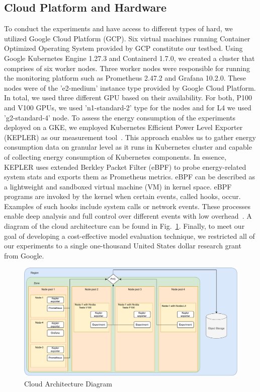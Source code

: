 \documentclass[conference]{IEEEtran}
\begin{document}
\subsection{Cloud Platform and Hardware}
To conduct the experiments and have access to different types of hard, we utilized Google Cloud Platform (GCP). Six virtual machines running Container Optimized Operating System provided by GCP constitute our testbed. Using Google Kubernetes Engine 1.27.3 and Containerd 1.7.0,  we created a cluster that comprises of six worker nodes. Three worker nodes were responsible for running the monitoring platform such as Prometheus 2.47.2 and Grafana 10.2.0. These nodes were of the 'e2-medium' instance type provided by Google Cloud Platform. In total, we used three different GPU based on their availability. For both, P100 and V100 GPUs, we used 'n1-standard-2' type for the nodes and for L4  we used 'g2-standard-4' node.
To assess the energy consumption of the experiments deployed on a GKE, we employed Kubernetes Efficient Power Level Exporter (KEPLER) as our measurement tool~\cite{amaral2023kepler}. This approach enables us to gather energy consumption data on granular level as it runs in Kubernetes cluster and capable of collecting energy consumption of Kubernetes components. In essence, KEPLER uses extended Berkley Packet Filter (eBPF) to probe energy-related system stats and exports them as Prometheus metrics. eBPF can be described as a lightweight and sandboxed virtual machine (VM) in kernel space. eBPF programs are invoked by the kernel when certain events, called hooks, occur. Examples of such hooks include system calls or network events. These processes enable deep analysis and full control over different events with low overhead~\cite{sedghpour@ebpf}. A diagram of the cloud architecture can be found in Fig.~\ref{fig:architecture}. Finally, to meet our goal of developing a cost-effective model evaluation technique, we restricted all of our experiments to a single one-thousand United States dollar research grant from Google. 

\begin{figure}
    \centering
    \includegraphics[width=\textwidth]{plots/architecture.pdf}
    \caption{Cloud Architecture Diagram}
    \label{fig:architecture}
\end{figure}
\end{document}
